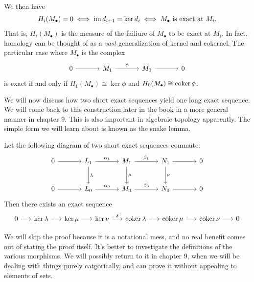We then have
\[
	H_i(M_\bullet)=0 \iff \operatorname{im} d_{i+1}=\ker d_i \iff M_\bullet\text{ is exact at }M_i
.\]
That is, $H_i(M_\bullet)$ is the measure of the failiure of $M_\bullet$ to be exact at $M_i$. In fact, homology can be thought of as a \emph{vast} generalization of kernel and cokernel. The particular case where $M_\bullet$ is the complex
\[\begin{tikzcd}[row sep=2.5em, column sep=3.5em]
	0\arrow[r]&M_1\arrow[r, "\phi "]&M_0\arrow[r]&0
\end{tikzcd}\]
is exact if and only if $H_1(M_\bullet)\cong \ker \phi $ and $H_0(M_\bullet)\cong \operatorname{coker} \phi $.

We will now discuss how two short exact sequences yield one long exact sequence. We will come back to this construction later in the book in a more general manner in chapter 9. This is also important in algebraic topology apparently. The simple form we will learn about is known as the snake lemma.

\begin{lemma}\label{lma:3.7.1}
	Let the following diagram of two short exact sequences commute:
	\[\begin{tikzcd}[row sep=2.5em, column sep=3.5em]
		0\arrow[r]&L_1\arrow[r, "\alpha _1"]\arrow[d, "\lambda "]&M_1\arrow[r, "\beta _1"]\arrow[d, "\mu "]&N_1\arrow[r]\arrow[d, "\nu "]&0\\
		0\arrow[r]&L_0\arrow[r, "\alpha _0"]&M_0\arrow[r, "\beta _0"]&N_0\arrow[r]&0
	\end{tikzcd}\]
	Then there exists an exact sequence
	\[\begin{tikzcd}[row sep=2.5em, column sep=1.5em]
		0\arrow[r]&\ker \lambda \arrow[r]&\ker \mu \arrow[r]&\ker \nu \arrow[r, "\delta "]&\coker \lambda \arrow[r]&\coker \mu \arrow[r]&\coker \nu \arrow[r]&0
	\end{tikzcd}\]
\end{lemma}
We will skip the proof because it is a notational mess, and no real benefit comes out of stating the proof itself. It's better to investigate the definitions of the various morphisms. We will possibly return to it in chapter 9, when we will be dealing with things purely catgorically, and can prove it without appealing to elements of sets.

